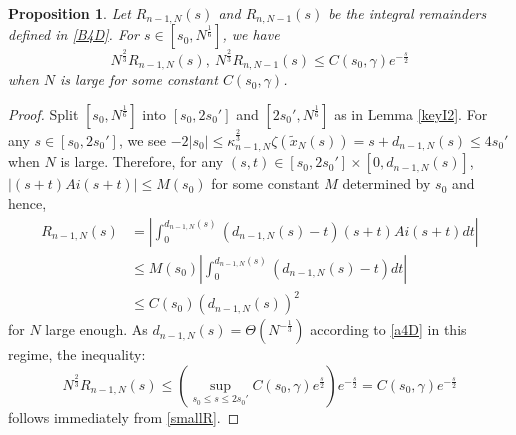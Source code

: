 \documentclass[11pt]{article}
\newtheorem{proposition}[theorem]{Proposition}
\numberwithin{equation}{section}%
\numberwithin{theorem}{section}
\begin{document}
\begin{proposition}\label{B4re}
Let $R_{n-1,N}(s)$ and $R_{n,N-1}(s)$ be the integral remainders defined in \eqref{B4D}. For $s\in\left[s_0,N^{\frac{1}{6}}\right]$, we have
\begin{equation*}
    N^{\frac{2}{3}}R_{n-1,N}(s),~N^\frac{2}{3}R_{n,N-1}(s)\le C(s_0,\gamma)e^{-\frac{s}{2}}
\end{equation*}
when $N$ is large for some constant $C(s_0,\gamma)$.
\end{proposition}
\begin{proof}
    Split $\left[s_0,N^{\frac{1}{6}}\right]$ into $[s_0,2s_0']$ and $\left[2s_0',N^{\frac{1}{6}}\right]$ as in Lemma \ref{keyI2}. For any $s\in[s_0,2s_0']$, we see $-2|s_0|\le\kappa_{n-1,N}^\frac{2}{3}\zeta(\tilde{x}_N(s))=s+d_{n-1,N}(s)\le 4s_0'$ when $N$ is large. Therefore, for any $(s,t)\in[s_0,2s_0']\times[0,d_{n-1,N}(s)]$, $|(s+t)Ai(s+t)|\le M(s_0)$ for some constant $M$ determined by $s_0$ and hence,
    \begin{equation}\label{smallR}
        \begin{split}
            R_{n-1,N}(s)&=\left|\int_0^{d_{n-1,N}(s)}(d_{n-1,N}(s)-t)(s+t)Ai(s+t)dt\right|\\
            &\le M(s_0)\left|\int_0^{d_{n-1,N}(s)}(d_{n-1,N}(s)-t)dt\right|\\&\le C(s_0)(d_{n-1,N}(s))^2
        \end{split}
    \end{equation}
    for $N$ large enough. As $d_{n-1,N}(s)=\Theta\left(N^{-\frac{1}{3}}\right)$ according to \eqref{a4D} in this regime, the inequality:
    \begin{equation}\label{smallR2}
        N^{\frac{2}{3}}R_{n-1,N}(s)\le \left(\sup_{s_0\le s\le 2s_0'}C(s_0,\gamma)e^{\frac{s}{2}}\right)e^{-\frac{s}{2}}=C(s_0,\gamma)e^{-\frac{s}{2}}
    \end{equation}
    follows immediately from \eqref{smallR}.


\end{proof}
\end{document}

